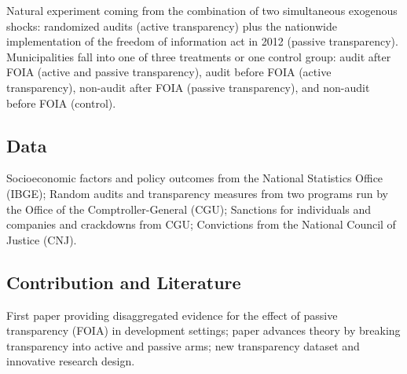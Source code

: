 \documentclass[]{article}
\begin{document}
Natural experiment coming from the combination of two simultaneous
exogenous shocks: randomized audits (active transparency) plus the
nationwide implementation of the freedom of information act in 2012
(passive transparency). Municipalities fall into one of three treatments
or one control group: audit after FOIA (active and passive
transparency), audit before FOIA (active transparency), non-audit after
FOIA (passive transparency), and non-audit before FOIA (control).

\hypertarget{data}{%
\subsection{Data}\label{data}}

Socioeconomic factors and policy outcomes from the National Statistics
Office (IBGE); Random audits and transparency measures from two programs
run by the Office of the Comptroller-General (CGU); Sanctions for
individuals and companies and crackdowns from CGU; Convictions from the
National Council of Justice (CNJ).

\hypertarget{contribution-and-literature}{%
\subsection{Contribution and
Literature}\label{contribution-and-literature}}

First paper providing disaggregated evidence for the effect of passive
transparency (FOIA) in development settings; paper advances theory by
breaking transparency into active and passive arms; new transparency
dataset and innovative research design.
\end{document}
